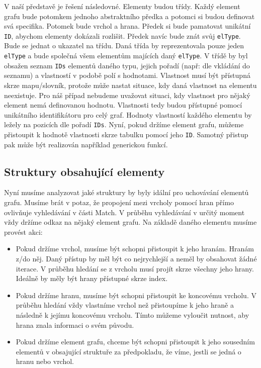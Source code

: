V naší představě je řešení následovné.
Elementy budou třídy.
Každý element grafu bude potomkem jednoho abstraktního předka a potomci si budou definovat svá specifika.
Potomek bude vrchol a hrana.
Předek si bude pamatovat unikátní \verb+ID+, abychom elementy dokázali rozlišit. 
Předek navíc bude znát svůj \verb+elType+. 
Bude se jednat o ukazatel na třídu.
Daná třída by reprezentovala pouze jeden \verb+elType+ a bude společná všem elementům majících daný \verb+elType+.
V třídě by byl obsažen seznam \verb+IDs+ elementů daného typu, jejich pořadí (např: dle vkládání do seznamu) a vlastností v podobě polí s hodnotami.
Vlastnost musí být přístupná skrze mapu/slovník, protože může nastat situace, kdy daná vlastnost na elementu neexistuje. 
Pro náš případ nebudeme uvažovat situaci, kdy vlastnost pro nějaký element nemá definovanou hodnotu.
Vlastnosti tedy budou přístupné pomocí unikátního identifikátoru pro celý graf.
Hodnoty vlastností každého elementu by ležely na pozicích dle pořadí \verb+IDs+.
Nyní, pokud držíme element grafu, můžeme přistoupit k hodnotě vlastnosti skrze tabulku pomocí jeho \verb+ID+.    
Samotný přistup pak může být realizován například generickou funkcí. 

\subsection{Struktury obsahující elementy}

Nyní musíme analyzovat jaké struktury by byly idální pro uchovávání elementů grafu.
Musíme brát v potaz, že propojení mezi vrcholy pomocí hran přímo ovlivňuje vyhledávání v části Match.
V průběhu vyhledávání v určitý moment vždy držíme odkaz na nějaký element grafu.
Na základě daného elementu musíme provést akci:

\begin{itemize}

\item Pokud držíme vrchol, musíme být schopni přistoupit k jeho hranám. Hranám z/do něj. Daný přístup by měl být co nejrychlejší a neměl by obsahovat žádné iterace. V průběhu hledání se z vrcholu musí projít skrze všechny jeho hrany. Ideálně by měly být hrany přístupné skrze index.

\item Pokud držíme hranu, musíme být schopni přistoupit ke koncovému vrcholu. V průběhu hledání vždy vlastníme vrchol než přistoupíme k jeho hraně a následně k jejímu koncovému vrcholu. Tímto můžeme vyloučit nutnost, aby hrana znala informaci o svém původu.

\item Pokud držíme element grafu, chceme být schopni přistoupit k jeho sousedním elementů v obsajující struktuře za předpokladu, že víme, jestli se jedná o hranu nebo vrchol. 

\end{itemize}

